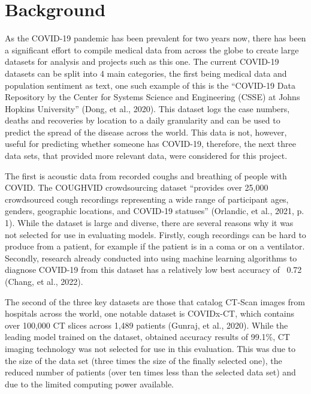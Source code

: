 \section{Background}
As the COVID-19 pandemic has been prevalent for two years now, there has been a significant effort to compile medical data from across the globe to create large datasets for analysis and projects such as this one. The current COVID-19 datasets can be split into 4 main categories, the first being medical data and population sentiment as text, one such example of this is the “COVID-19 Data Repository by the Center for Systems Science and Engineering (CSSE) at Johns Hopkins University” (Dong, et al., 2020). This dataset logs the case numbers, deaths and recoveries by location to a daily granularity and can be used to predict the spread of the disease across the world. This data is not, however, useful for predicting whether someone has COVID-19, therefore, the next three data sets, that provided more relevant data, were considered for this project.

The first is acoustic data from recorded coughs and breathing of people with COVID. The COUGHVID crowdsourcing dataset “provides over 25,000 crowdsourced cough recordings representing a wide range of participant ages, genders, geographic locations, and COVID-19 statuses” (Orlandic, et al., 2021, p. 1). While the dataset is large and diverse, there are several reasons why it was not selected for use in evaluating models. Firstly, cough recordings can be hard to produce from a patient, for example if the patient is in a coma or on a ventilator. Secondly, research already conducted into using machine learning algorithms to diagnose COVID-19 from this dataset has a relatively low best accuracy of ~0.72 (Chang, et al., 2022). 

The second of the three key datasets are those that catalog CT-Scan images from hospitals across the world, one notable dataset is COVIDx-CT, which contains over 100,000 CT slices across 1,489 patients (Gunraj, et al., 2020). While the leading model trained on the dataset, obtained accuracy results of 99.1\%, CT imaging technology was not selected for use in this evaluation. This was due to the size of the data set (three times the size of the finally selected one), the reduced number of patients (over ten times less than the selected data set) and due to the limited computing power available.

